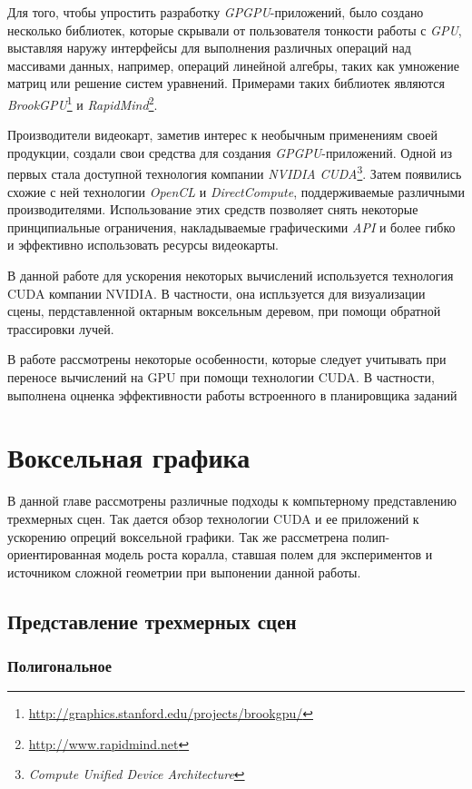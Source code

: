 \documentclass[a4paper,14pt]{extreport}
\begin{document}
Для того, чтобы упростить разработку \emph{GPGPU}-приложений, было создано несколько библиотек, которые скрывали от пользователя тонкости работы с \emph{GPU}, выставляя наружу интерфейсы для выполнения различных операций над массивами данных, например, операций линейной алгебры, таких как умножение матриц или решение систем уравнений. Примерами таких библиотек являются \emph{BrookGPU}\footnote{\url{http://graphics.stanford.edu/projects/brookgpu/}} и \emph{RapidMind}\footnote{\url{http://www.rapidmind.net}}.

Производители видеокарт, заметив интерес к необычным применениям своей продукции, создали свои средства для создания \emph{GPGPU}-приложений. Одной из первых стала доступной технология компании \emph{NVIDIA} \emph{CUDA}\footnote{\emph{Compute Unified Device Architecture}}. Затем появились схожие с ней технологии \emph{OpenCL} и \emph{DirectCompute}, поддерживаемые различными производителями. Использование этих средств позволяет снять некоторые принципиальные ограничения, накладываемые графическими \emph{API} и более гибко и эффективно использовать ресурсы видеокарты.

В данной работе для ускорения некоторых вычислений используется технология CUDA компании NVIDIA. В частности, она испльзуется для визуализации сцены, пердставленной октарным воксельным деревом, при помощи обратной трассировки лучей.

В работе рассмотрены некоторые особенности, которые следует учитывать при переносе вычислений на GPU при помощи технологии CUDA. В частности, выполнена оцненка эффективности работы встроенного в планировщика заданий

\chapter{Воксельная графика}

В данной главе рассмотрены различные подходы к компьтерному представлению трехмерных сцен. Так дается обзор технологии CUDA и ее приложений к ускорению опреций воксельной графики. Так же рассметрена полип-ориентированная модель роста коралла, ставшая полем для экспериментов и источником сложной геометрии при выпонении данной работы.

\section{Представление трехмерных сцен}
\subsection{Полигональное}
\end{document}
